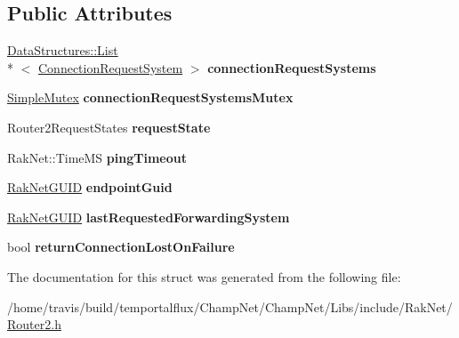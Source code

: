 \subsection*{Public Attributes}
\begin{DoxyCompactItemize}
\item 
\hypertarget{struct_rak_net_1_1_router2_1_1_connnect_request_ac3b0ad941951384d8a52a1bd3d866587}{\hyperlink{class_data_structures_1_1_list}{Data\-Structures\-::\-List}\\*
$<$ \hyperlink{struct_rak_net_1_1_router2_1_1_connection_request_system}{Connection\-Request\-System} $>$ {\bfseries connection\-Request\-Systems}}\label{struct_rak_net_1_1_router2_1_1_connnect_request_ac3b0ad941951384d8a52a1bd3d866587}

\item 
\hypertarget{struct_rak_net_1_1_router2_1_1_connnect_request_ac8ed7fca95d605cc2d383427b5e1075a}{\hyperlink{class_rak_net_1_1_simple_mutex}{Simple\-Mutex} {\bfseries connection\-Request\-Systems\-Mutex}}\label{struct_rak_net_1_1_router2_1_1_connnect_request_ac8ed7fca95d605cc2d383427b5e1075a}

\item 
\hypertarget{struct_rak_net_1_1_router2_1_1_connnect_request_a42e01259d297c76e31c4542bca4981b1}{Router2\-Request\-States {\bfseries request\-State}}\label{struct_rak_net_1_1_router2_1_1_connnect_request_a42e01259d297c76e31c4542bca4981b1}

\item 
\hypertarget{struct_rak_net_1_1_router2_1_1_connnect_request_ace7f22f66eaef311dd2177c03268b61d}{Rak\-Net\-::\-Time\-M\-S {\bfseries ping\-Timeout}}\label{struct_rak_net_1_1_router2_1_1_connnect_request_ace7f22f66eaef311dd2177c03268b61d}

\item 
\hypertarget{struct_rak_net_1_1_router2_1_1_connnect_request_abf1019cf26bc0884b017c49950e5a11f}{\hyperlink{struct_rak_net_1_1_rak_net_g_u_i_d}{Rak\-Net\-G\-U\-I\-D} {\bfseries endpoint\-Guid}}\label{struct_rak_net_1_1_router2_1_1_connnect_request_abf1019cf26bc0884b017c49950e5a11f}

\item 
\hypertarget{struct_rak_net_1_1_router2_1_1_connnect_request_a8987a8da5c30edbcced88724ea602b43}{\hyperlink{struct_rak_net_1_1_rak_net_g_u_i_d}{Rak\-Net\-G\-U\-I\-D} {\bfseries last\-Requested\-Forwarding\-System}}\label{struct_rak_net_1_1_router2_1_1_connnect_request_a8987a8da5c30edbcced88724ea602b43}

\item 
\hypertarget{struct_rak_net_1_1_router2_1_1_connnect_request_af1db515b4356ec3c3edc475619cc91ed}{bool {\bfseries return\-Connection\-Lost\-On\-Failure}}\label{struct_rak_net_1_1_router2_1_1_connnect_request_af1db515b4356ec3c3edc475619cc91ed}

\end{DoxyCompactItemize}


The documentation for this struct was generated from the following file\-:\begin{DoxyCompactItemize}
\item 
/home/travis/build/temportalflux/\-Champ\-Net/\-Champ\-Net/\-Libs/include/\-Rak\-Net/\hyperlink{_router2_8h}{Router2.\-h}\end{DoxyCompactItemize}
